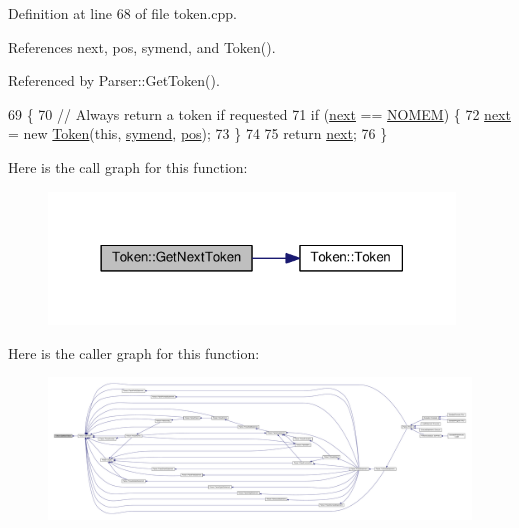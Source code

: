 Definition at line 68 of file token.\+cpp.



References next, pos, symend, and Token().



Referenced by Parser\+::\+Get\+Token().


\begin{DoxyCode}
69 \{
70     \textcolor{comment}{// Always return a token if requested}
71     \textcolor{keywordflow}{if} (\hyperlink{structToken_a32f24a25af788c192e5b387dc8d67914}{next} == \hyperlink{platform_8h_a46ff2bfbf0d44b8466a2251d5bd5e6f8}{NOMEM}) \{
72         \hyperlink{structToken_a32f24a25af788c192e5b387dc8d67914}{next} = \textcolor{keyword}{new} \hyperlink{structToken_a6331b847b4dc8cebe0e0a79c4de63204}{Token}(\textcolor{keyword}{this}, \hyperlink{lex_8h_a7feef761cd73fac6e25b8bb80d2c4e54a9be8426421896b360944c1313abeffdb}{symend}, \hyperlink{structToken_afc3014d7e8cbd70e58a55bea24fc2544}{pos});
73     \}
74 
75     \textcolor{keywordflow}{return} \hyperlink{structToken_a32f24a25af788c192e5b387dc8d67914}{next};
76 \}
\end{DoxyCode}


Here is the call graph for this function\+:\nopagebreak
\begin{figure}[H]
\begin{center}
\leavevmode
\includegraphics[width=306pt]{structToken_ac7eb963d5eff544dd48ffc23aa274356_cgraph}
\end{center}
\end{figure}




Here is the caller graph for this function\+:\nopagebreak
\begin{figure}[H]
\begin{center}
\leavevmode
\includegraphics[width=350pt]{structToken_ac7eb963d5eff544dd48ffc23aa274356_icgraph}
\end{center}
\end{figure}


